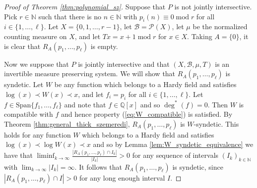 \documentclass[12pt]{article}
\theoremstyle{plain} %
\theoremstyle{definition} %
\theoremstyle{plain}
\theoremstyle{plain}
\numberwithin{equation}{section}
\newcommand{\N}{\mathbb{N}}
\newcommand{\Q}{\mathbb{Q}}
\newcommand{\1}{\mathbbm{1}}
\newcommand{\oo}{\infty}
\renewcommand{\mod}{\operatorname{mod}}
\begin{document}
\begin{proof}[Proof of Theorem \ref{thm:polynomial_sz}]
    Suppose that $P$ is not jointly intersective. Pick $r\in \N$ such that there is no $n\in \N$ with $p_i(n)\equiv 0\mod r$ for all $i\in \{1,\dots, \ell\}$. Let $X = \{0,1,\dots, r-1\}$, let $\mathscr{B} = \mathscr{P}(X)$, let $\mu$ be the normalized counting measure on $X$, and let $Tx = x+1\mod r$ for $x\in X$. Taking $A = \{0\}$, it is clear that $R_A(p_1,\dots, p_{\ell})$ is empty.

    Now we suppose that $P$ is jointly intersective and that $(X,\mathscr{B},\mu,T)$ is an invertible measure preserving system. We will show that $R_A(p_1,\dots, p_{\ell})$ is syndetic. Let $W$ be any function which belongs to a Hardy field and satisfies $\log(x)\prec  W(x)\prec x$, and let $f_i = p_i$ for all $i\in \{1,\dots, \ell\}$. Let $f\in \text{Span}\{f_1,\dots, f_{\ell}\}$ and note that $f\in \Q[x]$ and so $\deg^*(f)=0$. Then $W$ is compatible with $f$ and hence property (\ref{eq:W_compatible}) is satisfied. By Theorem \ref{thm:general_thick_szemeredi}, $R_A(p_1,\dots, p_{\ell})$ is $W$-syndetic. This holds for any function $W$ which belongs to a Hardy field and satisfies $\log(x)\prec \log W(x)\prec x$ and so by Lemma \ref{lem:W_syndetic_equivalence} we have that $\liminf_{k\to\oo}\frac{|R_{A}(p_1,\dots, p_{\ell})\cap I_k|}{|I_k|}>0$ for any sequence of intervals $(I_k)_{k\in \N}$ with $\lim_{k\to\oo}|I_k|=\oo$. It follows that $R_{A}(p_1,\dots, p_{\ell})$ is syndetic, since $|R_{A}(p_1,\dots, p_{\ell})\cap I|>0$ for any long enough interval $I$.  
\end{proof}
\end{document}
